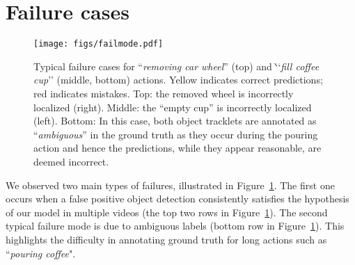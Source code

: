 \section{Failure cases}
\label{app:failcases}

\begin{figure}[t!]
	\centering
	\texttt{[image: figs/failmode.pdf]}
	\caption{
		Typical failure cases for ``\textit{removing car wheel}'' (top) and
		`̀`\textit{fill coffee cup}'' (middle, bottom) actions. 
		Yellow indicates correct predictions; red indicates mistakes. Top: the removed wheel is incorrectly localized (right). 
		Middle: the ``empty cup'' is incorrectly
		localized (left). 
		Bottom: In this case, both object tracklets are annotated as ``\textit{ambiguous}'' in the ground truth as they occur during
		the pouring action and hence the predictions, while they appear
		reasonable, are deemed incorrect.
	}
	\vspace{-2mm} %
	\label{fig:failcases}
\end{figure}	

We observed two main types of failures, illustrated in Figure~\ref{fig:failcases}. 
The first one occurs when a false positive object detection consistently satisfies the hypothesis of our model in multiple videos (the top two rows in Figure~\ref{fig:failcases}).
The second typical failure mode is due to ambiguous labels (bottom row in Figure~\ref{fig:failcases}). 
This highlights the difficulty in
annotating ground truth for long actions such as ``\textit{pouring coffee}".